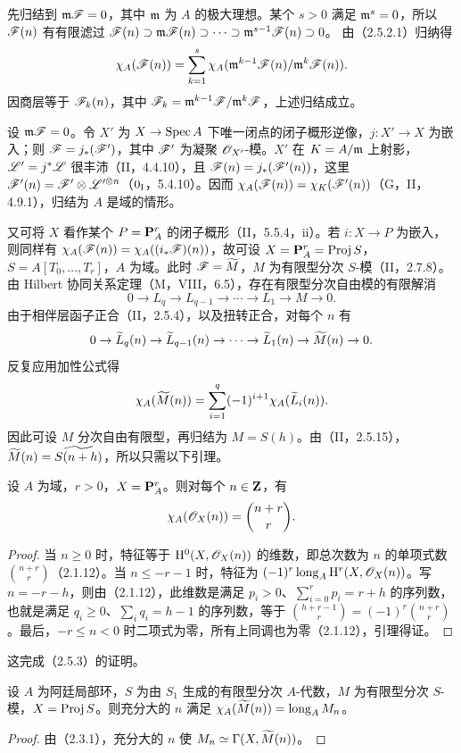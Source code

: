 先归结到 $\mathfrak m\mathscr F=0$，其中 $\mathfrak m$ 为 $A$ 的极大理想。某个 $s>0$ 满足 $\mathfrak m^s=0$，所以 $\mathscr F(n)$ 有有限滤过
$\mathscr F(n)\supset\mathfrak m\mathscr F(n)\supset\cdots\supset\mathfrak m^{s-1}\mathscr F(n)\supset0$。
由（2.5.2.1）归纳得
\[
\chi_A(\mathscr F(n))=\sum_{k=1}^s\chi_A(\mathfrak m^{k-1}\mathscr F(n)/\mathfrak m^k\mathscr F(n)).
\]
因商层等于 $\mathscr F_k(n)$，其中 $\mathscr F_k=\mathfrak m^{k-1}\mathscr F/\mathfrak m^k\mathscr F$，上述归结成立。

设 $\mathfrak m\mathscr F=0$。令 $X'$ 为 $X\to\operatorname{Spec} A$ 下唯一闭点的闭子概形逆像，$j:X'\to X$ 为嵌入；则 $\mathscr F=j_*(\mathscr F')$，其中 $\mathscr F'$ 为凝聚 $\mathscr O_{X'}$-模。$X'$ 在 $K=A/\mathfrak m$ 上射影，$\mathscr L'=j^*\mathscr L$ 很丰沛（II，4.4.10），且 $\mathscr F(n)=j_*(\mathscr F'(n))$，这里 $\mathscr F'(n)=\mathscr F'\otimes\mathscr L'^{\otimes n}$（$0_{\mathrm I}$，5.4.10）。因而 $\chi_A(\mathscr F(n))=\chi_K(\mathscr F'(n))$（G，II，4.9.1），归结为 $A$ 是域的情形。

又可将 $X$ 看作某个 $P=\mathbf P_A^r$ 的闭子概形（II，5.5.4，ii）。若 $i:X\to P$ 为嵌入，则同样有 $\chi_A(\mathscr F(n))=\chi_A((i_*\mathscr F)(n))$，故可设 $X=\mathbf P_A^r=\operatorname{Proj} S$，$S=A[T_0,\ldots,T_r]$，$A$ 为域。此时 $\mathscr F=\widetilde{M}$，$M$ 为有限型分次 $S$-模（II，2.7.8）。由 Hilbert 协同关系定理（M，VIII，6.5），存在有限型分次自由模的有限解消
\[
0\to L_q\to L_{q-1}\to\cdots\to L_1\to M\to0.
\]
由于相伴层函子正合（II，2.5.4），以及扭转正合，对每个 $n$ 有
\[
0\to\widetilde{L}_q(n)\to\widetilde{L}_{q-1}(n)\to\cdots\to\widetilde{L}_1(n)\to\widetilde{M}(n)\to0.
\]
反复应用加性公式得
\[
\chi_A(\widetilde{M}(n))=\sum_{i=1}^q(-1)^{i+1}\chi_A(\widetilde{L}_i(n)).
\]
因此可设 $M$ 分次自由有限型，再归结为 $M=S(h)$。由（II，2.5.15），$\widetilde{M}(n)=\widetilde{S(n+h)}$，所以只需以下引理。

设 $A$ 为域，$r>0$，$X=\mathbf P_A^r$。则对每个 $n\in\mathbf Z$，有
\[
\chi_A(\mathscr O_X(n))=\binom{n+r}{r}.
\]
\begin{proof}
当 $n\geq0$ 时，特征等于 $\mathrm H^0(X,\mathscr O_X(n))$ 的维数，即总次数为 $n$ 的单项式数 $\binom{n+r}{r}$（2.1.12）。当 $n\leq-r-1$ 时，特征为 $(-1)^r\operatorname{long}_A\mathrm H^r(X,\mathscr O_X(n))$。写 $n=-r-h$，则由（2.1.12），此维数是满足 $p_i>0$、$\sum_{i=0}^rp_i=r+h$ 的序列数，也就是满足 $q_i\geq0$、$\sum_iq_i=h-1$ 的序列数，等于 $\binom{h+r-1}{r}=(-1)^r\binom{n+r}{r}$。最后，$-r\leq n<0$ 时二项式为零，所有上同调也为零（2.1.12），引理得证。
\end{proof}
这完成（2.5.3）的证明。\finishproof

设 $A$ 为阿廷局部环，$S$ 为由 $S_1$ 生成的有限型分次 $A$-代数，$M$ 为有限型分次 $S$-模，$X=\operatorname{Proj} S$。则充分大的 $n$ 满足 $\chi_A(\widetilde{M}(n))=\operatorname{long}_AM_n$。
\begin{proof}
由（2.3.1），充分大的 $n$ 使 $M_n\simeq\Gamma(X,\widetilde{M}(n))$。
\end{proof}

